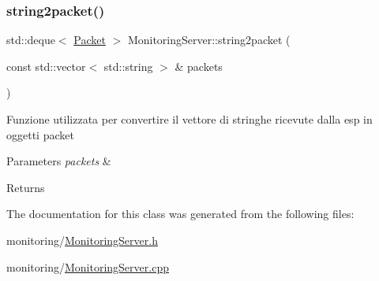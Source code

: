 \subsubsection{\texorpdfstring{string2packet()}{string2packet()}}
{\footnotesize\ttfamily std\+::deque$<$ \hyperlink{class_packet}{Packet} $>$ Monitoring\+Server\+::string2packet (\begin{DoxyParamCaption}\item[{const std\+::vector$<$ std\+::string $>$ \&}]{packets }\end{DoxyParamCaption})}

Funzione utilizzata per convertire il vettore di stringhe ricevute dalla esp in oggetti packet 
\begin{DoxyParams}{Parameters}
{\em packets} & \\
\hline
\end{DoxyParams}
\begin{DoxyReturn}{Returns}

\end{DoxyReturn}


The documentation for this class was generated from the following files\+:\begin{DoxyCompactItemize}
\item 
monitoring/\hyperlink{_monitoring_server_8h}{Monitoring\+Server.\+h}\item 
monitoring/\hyperlink{_monitoring_server_8cpp}{Monitoring\+Server.\+cpp}\end{DoxyCompactItemize}
